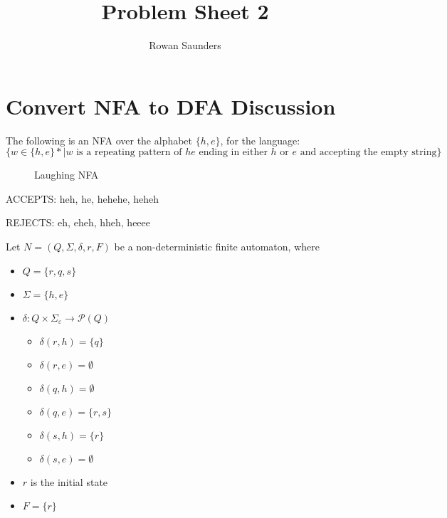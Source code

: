 \documentclass[11pt]{article}
\title{Problem Sheet 2}
\author{Rowan Saunders}
\begin{document}
\begin{titlepage}
	\maketitle
\end{titlepage}

\section{Convert NFA to DFA Discussion}
The following is an NFA over the alphabet $\{h,e\}$, for the language:
$$\{w \in \{h,e\}\ast | w \text{ is a repeating pattern of } he \text{ ending in
either } h \text{ or } e \text{ and accepting the empty string}\}$$

\begin{figure}[H]
	\centering
	\caption{Laughing NFA}
	\label{fig:laughingnfa}
\end{figure}

ACCEPTS: heh, he, hehehe, heheh

REJECTS: eh, eheh, hheh, heeee

Let $N=(Q,\Sigma,\delta,r,F)$ be a non-deterministic finite automaton, where

\begin{itemize}
	\item $Q = \{r, q, s\}$
	\item $\Sigma = \{h, e\}$
  \item $\delta : Q \times \Sigma_\varepsilon \to \mathcal{P}(Q)$
		\begin{itemize}
			\item $\delta(r,h)=\{q\}$
			\item $\delta(r,e)=\emptyset$
			\item $\delta(q,h)=\emptyset$
			\item $\delta(q,e)=\{r,s\}$
			\item $\delta(s,h)=\{r\}$
			\item $\delta(s,e)=\emptyset$
		\end{itemize}
	\item $r$ is the initial state
	\item $F = \{r\}$
\end{itemize}
\end{document}
